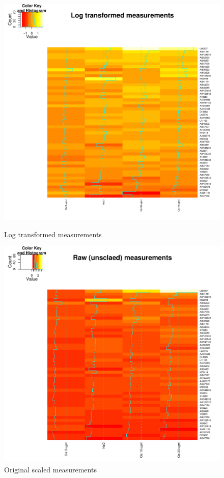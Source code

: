\documentclass[12pt, oneside, letterpaper]{article}
\begin{document}
\begin{itemize}
\begin{figure}[p]
\begin{minipage}[t]{2.5in}
\begin{center}
\includegraphics[width=\textwidth]{logData}
\caption{Log transformed measurements}
\label{Log transformed measurements}
\end{center}
\end{minipage}
\hfill
\begin{minipage}[t]{2.5in}
\begin{center}
\includegraphics[width=\textwidth]{origScale}
\caption{Original scaled measurements}
\label{Original scaled measurements}
\end{center}
\end{minipage}


\end{figure}
\end{itemize}
\end{document}
